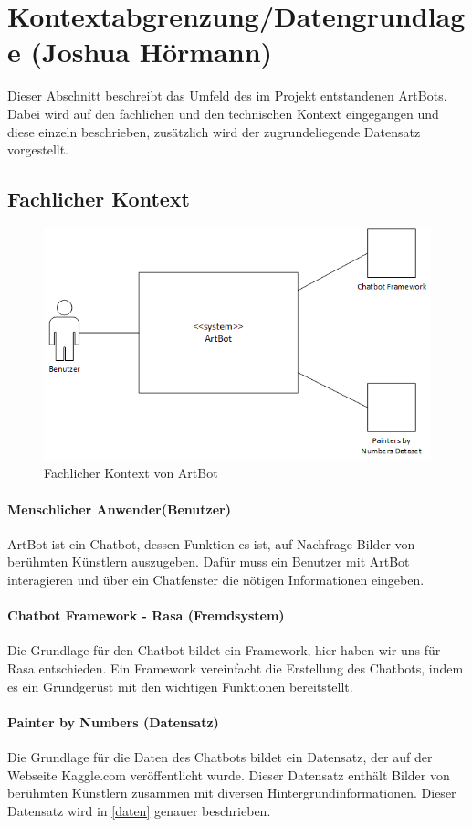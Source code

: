 \section{Kontextabgrenzung/Datengrundlage (Joshua Hörmann)}
Dieser Abschnitt beschreibt das Umfeld des im Projekt entstandenen ArtBots. Dabei wird auf den fachlichen und den technischen Kontext eingegangen und diese einzeln beschrieben, zusätzlich wird der zugrundeliegende Datensatz vorgestellt.
\subsection{Fachlicher Kontext} \label{fach_text}
 \begin{figure}[H]
	\centerline{\includegraphics[width=0.6\linewidth]{figures/fachKontext.png}}
	\caption{Fachlicher Kontext von ArtBot}
	\label{fachKontext}
\end{figure}
	
\paragraph{Menschlicher Anwender(Benutzer)}
ArtBot ist ein Chatbot, dessen Funktion es ist, auf Nachfrage Bilder von berühmten Künstlern auszugeben. Dafür muss ein Benutzer mit ArtBot interagieren und über ein Chatfenster die nötigen Informationen eingeben.  

\paragraph{Chatbot Framework - Rasa (Fremdsystem)}
Die Grundlage für den Chatbot bildet ein Framework, hier haben wir uns für Rasa entschieden. Ein Framework vereinfacht die Erstellung des Chatbots, indem es ein Grundgerüst mit den wichtigen Funktionen bereitstellt.

\paragraph{Painter by Numbers (Datensatz)}
Die Grundlage für die Daten des Chatbots bildet ein Datensatz, der auf der Webseite Kaggle.com veröffentlicht wurde. Dieser Datensatz enthält Bilder von berühmten Künstlern zusammen mit diversen Hintergrundinformationen. Dieser Datensatz wird in \ref{daten} genauer beschrieben.
\newpage

